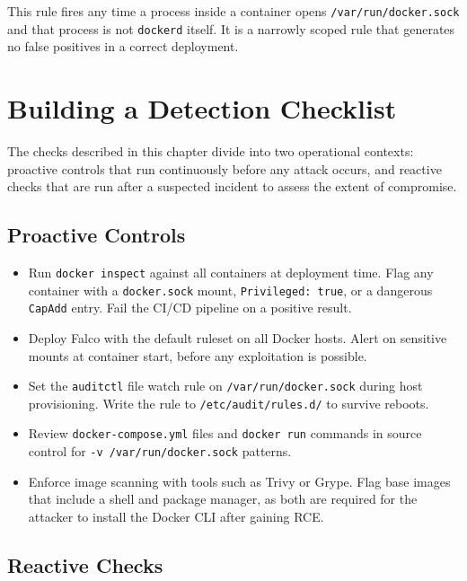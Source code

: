 This rule fires any time a process inside a container opens \texttt{/var/run/docker.sock} and that process is not \texttt{dockerd} itself. It is a narrowly scoped rule that generates no false positives in a correct deployment.


\section{Building a Detection Checklist}

The checks described in this chapter divide into two operational contexts: proactive controls that run continuously before any attack occurs, and reactive checks that are run after a suspected incident to assess the extent of compromise.

\subsection{Proactive Controls}

\begin{itemize}
    \item Run \texttt{docker inspect} against all containers at deployment time. Flag any container with a \texttt{docker.sock} mount, \texttt{Privileged: true}, or a dangerous \texttt{CapAdd} entry. Fail the CI/CD pipeline on a positive result.
    \item Deploy Falco with the default ruleset on all Docker hosts. Alert on sensitive mounts at container start, before any exploitation is possible.
    \item Set the \texttt{auditctl} file watch rule on \texttt{/var/run/docker.sock} during host provisioning. Write the rule to \texttt{/etc/audit/rules.d/} to survive reboots.
    \item Review \texttt{docker-compose.yml} files and \texttt{docker run} commands in source control for \texttt{-v /var/run/docker.sock} patterns.
    \item Enforce image scanning with tools such as Trivy or Grype. Flag base images that include a shell and package manager, as both are required for the attacker to install the Docker CLI after gaining RCE.
\end{itemize}

\subsection{Reactive Checks}

